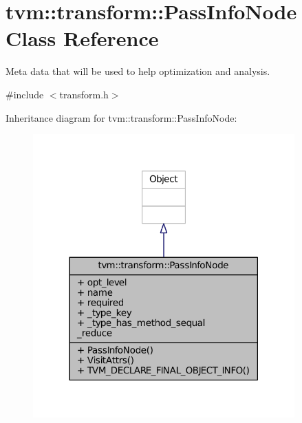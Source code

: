 \hypertarget{classtvm_1_1transform_1_1PassInfoNode}{}\section{tvm\+:\+:transform\+:\+:Pass\+Info\+Node Class Reference}
\label{classtvm_1_1transform_1_1PassInfoNode}


Meta data that will be used to help optimization and analysis.  




{\ttfamily \#include $<$transform.\+h$>$}



Inheritance diagram for tvm\+:\+:transform\+:\+:Pass\+Info\+Node\+:
\nopagebreak
\begin{figure}[H]
\begin{center}
\leavevmode
\includegraphics[width=285pt]{classtvm_1_1transform_1_1PassInfoNode__inherit__graph}
\end{center}
\end{figure}


